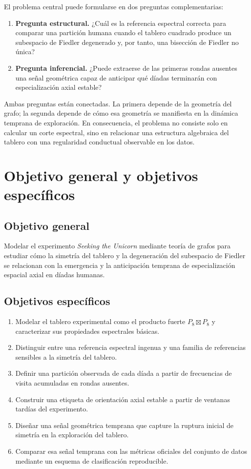 \documentclass[journal]{IEEEtran}
\begin{document}
El problema central puede formularse en dos preguntas complementarias:
\begin{enumerate}
\item \textbf{Pregunta estructural.} ¿Cuál es la referencia espectral correcta para comparar una partición humana cuando el tablero cuadrado produce un subespacio de Fiedler degenerado y, por tanto, una bisección de Fiedler no única?
\item \textbf{Pregunta inferencial.} ¿Puede extraerse de las primeras rondas ausentes una señal geométrica capaz de anticipar qué díadas terminarán con especialización axial estable?
\end{enumerate}

Ambas preguntas están conectadas. La primera depende de la geometría del grafo; la segunda depende de cómo esa geometría se manifiesta en la dinámica temprana de exploración. En consecuencia, el problema no consiste solo en calcular un corte espectral, sino en relacionar una estructura algebraica del tablero con una regularidad conductual observable en los datos.

\section{Objetivo general y objetivos específicos}

\subsection{Objetivo general}

Modelar el experimento \emph{Seeking the Unicorn} mediante teoría de grafos para estudiar cómo la simetría del tablero y la degeneración del subespacio de Fiedler se relacionan con la emergencia y la anticipación temprana de especialización espacial axial en díadas humanas.

\subsection{Objetivos específicos}

\begin{enumerate}
\item Modelar el tablero experimental como el producto fuerte $P_8 \boxtimes P_8$ y caracterizar sus propiedades espectrales básicas.
\item Distinguir entre una referencia espectral ingenua y una familia de referencias sensibles a la simetría del tablero.
\item Definir una partición observada de cada díada a partir de frecuencias de visita acumuladas en rondas ausentes.
\item Construir una etiqueta de orientación axial estable a partir de ventanas tardías del experimento.
\item Diseñar una señal geométrica temprana que capture la ruptura inicial de simetría en la exploración del tablero.
\item Comparar esa señal temprana con las métricas oficiales del conjunto de datos mediante un esquema de clasificación reproducible.
\end{enumerate}
\end{document}
